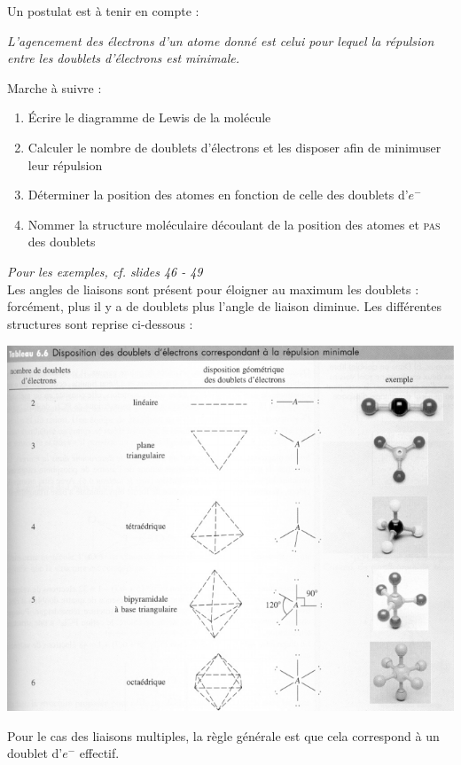 \documentclass[british,french,11pt, a4paper, openany]{book}
\begin{document}
Un postulat est à tenir en compte :
\begin{center}
	\textit{L'agencement des électrons d'un atome donné est celui pour lequel la répulsion entre les doublets d'électrons est minimale.}\end{center}
	Marche à suivre : 
	\begin{enumerate}
		\item Écrire le diagramme de Lewis de la molécule
		\item Calculer le nombre de doublets d'électrons et les disposer afin de minimuser leur répulsion
		\item Déterminer la position des atomes en fonction de celle des doublets d'$e^-$
		\item Nommer la structure moléculaire découlant de la position des atomes et \textsc{pas} des doublets
	\end{enumerate}
	\textit{Pour les exemples, cf. slides 46 - 49}\\
	
	Les angles de liaisons sont présent pour éloigner au maximum les doublets : forcément, plus il y a de doublets plus l'angle de liaison diminue. Les différentes structures sont reprise ci-dessous : 
	\begin{center}
		\includegraphics[scale=0.55]{image12.png}\\
	\end{center}
	Pour le cas des liaisons multiples, la règle générale est que cela correspond à un doublet d'$e^-$ effectif.
	
\end{document}

